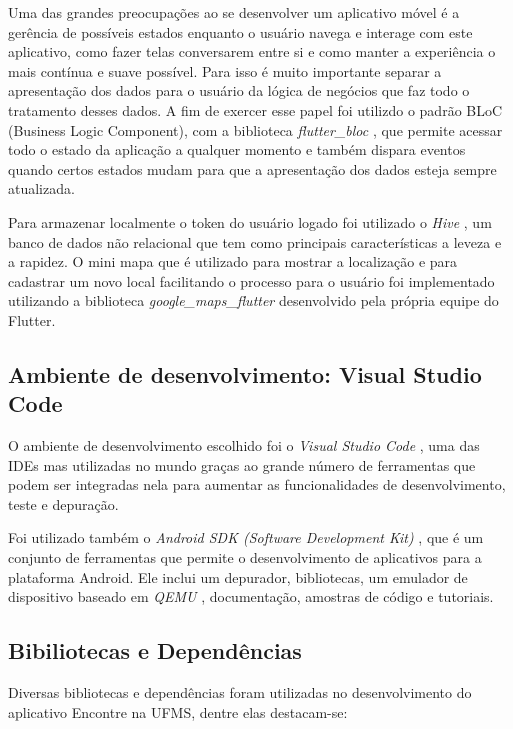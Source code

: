 Uma das grandes preocupações ao se desenvolver um aplicativo móvel é a gerência de possíveis estados enquanto o usuário navega e interage com este aplicativo, como fazer telas conversarem entre si e como manter a experiência o mais contínua e suave possível. Para isso é muito importante separar a apresentação dos dados para o usuário da lógica de negócios que faz todo o tratamento desses dados. A fim de exercer esse papel foi utilizdo o padrão BLoC (Business Logic Component), com a biblioteca \textit{flutter\_bloc} \cite{flutterbloc}, que permite acessar todo o estado da aplicação a qualquer momento e também dispara eventos quando certos estados mudam para que a apresentação dos dados esteja sempre atualizada.

Para armazenar localmente o token do usuário logado foi utilizado o \textit{Hive} \cite{hive}, um banco de dados não relacional que tem como principais características a leveza e a rapidez. O mini mapa que é utilizado para mostrar a localização e para cadastrar um novo local facilitando o processo para o usuário foi implementado utilizando a biblioteca \textit{google\_maps\_flutter} \cite{googlemapsflutter} desenvolvido pela própria equipe do Flutter. 

\subsection{Ambiente de desenvolvimento: Visual Studio Code}
O ambiente de desenvolvimento escolhido foi o \textit{Visual Studio Code} \cite{visualstudiocode}, uma das IDEs mas utilizadas no mundo graças ao grande número de ferramentas que podem ser integradas nela para aumentar as funcionalidades de desenvolvimento, teste e depuração.

Foi utilizado também o \textit{Android SDK (Software Development Kit)} \cite{androidsdk}, que é um conjunto de ferramentas que permite o desenvolvimento de aplicativos para a plataforma Android. Ele inclui um depurador, bibliotecas, um emulador de dispositivo baseado em \textit{QEMU} \cite{QEMU}, documentação, amostras de código e tutoriais.

\subsection{Bibiliotecas e Dependências}
Diversas bibliotecas e dependências foram utilizadas no desenvolvimento do aplicativo Encontre na UFMS, dentre elas destacam-se:

